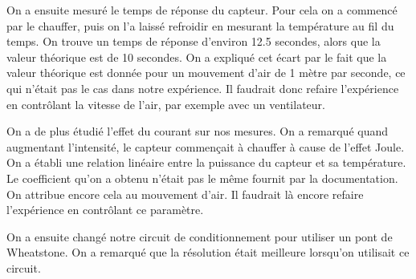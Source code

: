 \documentclass[12pt]{article}
\begin{document}
On a ensuite mesuré le temps de réponse du capteur. Pour cela on a commencé par le chauffer, puis on l'a laissé refroidir en mesurant la température au fil du temps. On trouve un temps de réponse d'environ 12.5 secondes, alors que la valeur théorique est de 10 secondes. On a expliqué cet écart par le fait que la valeur théorique est donnée pour un mouvement d'air de 1 mètre par seconde, ce qui n'était pas le cas dans notre expérience. Il faudrait donc refaire l'expérience en contrôlant la vitesse de l'air, par exemple avec un ventilateur.

On a de plus étudié l'effet du courant sur nos mesures. On a remarqué quand augmentant l'intensité, le capteur commençait à chauffer à cause de l'effet Joule. On a établi une relation linéaire entre la puissance du capteur et sa température. Le coefficient qu'on a obtenu n'était pas le même fournit par la documentation. On attribue encore cela au mouvement d'air. Il faudrait là encore refaire l'expérience en contrôlant ce paramètre. 

On a ensuite changé notre circuit de conditionnement pour utiliser un pont de Wheatstone. On a remarqué que la résolution était meilleure lorsqu'on utilisait ce circuit.  



\newpage
\end{document}
